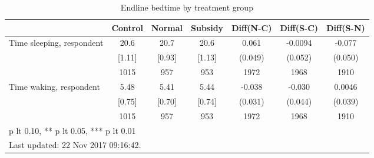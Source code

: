 \begin{table}[htbp]\centering
\def\sym#1{\ifmmode^{#1}\else\(^{#1}\)\fi}
\caption{Endline bedtime by treatment group \label{tab:"balance"}}
\begin{tabular*}{1\hsize}{@{\hskip\tabcolsep\extracolsep\fill}l*{1}{cccccc}}
\toprule
                                &  Control&   Normal&  Subsidy&Diff(N-C)         &Diff(S-C)         &Diff(S-N)         \\
\midrule
Time sleeping, respondent       &     20.6&     20.7&     20.6&    0.061         &  -0.0094         &   -0.077         \\
                                &   [1.11]&   [0.93]&   [1.13]&  (0.049)         &  (0.052)         &  (0.050)         \\
                                &     1015&      957&      953&     1972         &     1968         &     1910         \\
Time waking, respondent         &     5.48&     5.41&     5.44&   -0.038         &   -0.030         &   0.0046         \\
                                &   [0.75]&   [0.70]&   [0.74]&  (0.031)         &  (0.044)         &  (0.039)         \\
                                &     1015&      957&      953&     1972         &     1968         &     1910         \\
\bottomrule
\multicolumn{7}{l}{\footnotesize * p lt 0.10, ** p lt 0.05, *** p lt 0.01}\\
\multicolumn{7}{l}{\footnotesize Last updated: 22 Nov 2017 09:16:42.}\\
\end{tabular*}
\end{table}
